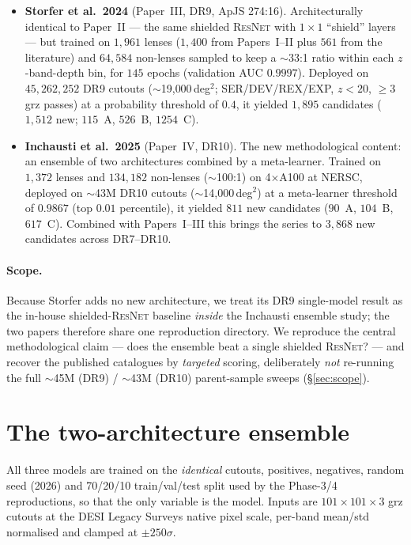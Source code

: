 \documentclass[11pt,letterpaper]{article}
\newcommand{\ResNet}{\textsc{ResNet}}
\begin{document}
\begin{itemize}
  \item \textbf{Storfer et al.\ 2024} \citep{storfer2024dr9} (Paper~III, DR9,
  ApJS 274:16). Architecturally identical to Paper~II --- the same shielded
  \ResNet{} with $1{\times}1$ ``shield'' layers --- but trained on $1{,}961$
  lenses ($1{,}400$ from Papers~I--II plus $561$ from the literature) and
  $64{,}584$ non-lenses sampled to keep a $\sim$33:1 ratio within each
  $z$-band-depth bin, for $145$ epochs (validation AUC $0.9997$). Deployed on
  $45{,}262{,}252$ DR9 cutouts ($\sim$19{,}000\,deg$^2$; SER/DEV/REX/EXP,
  $z<20$, $\ge 3$ grz passes) at a probability threshold of $0.4$, it yielded
  $1{,}895$ candidates ($1{,}512$ new; $115$~A, $526$~B, $1254$~C).
  \item \textbf{Inchausti et al.\ 2025} \citep{inchausti2025dr10} (Paper~IV,
  DR10). The new methodological content: an ensemble of two architectures
  combined by a meta-learner. Trained on $1{,}372$ lenses and $134{,}182$
  non-lenses ($\sim$100:1) on 4$\times$A100 at NERSC, deployed on $\sim$43M DR10
  cutouts ($\sim$14{,}000\,deg$^2$) at a meta-learner threshold of $0.9867$ (top
  $0.01$ percentile), it yielded $811$ new candidates ($90$~A, $104$~B,
  $617$~C). Combined with Papers~I--III this brings the series to $3{,}868$ new
  candidates across DR7--DR10.
\end{itemize}

\paragraph{Scope.} Because Storfer adds no new architecture, we treat its DR9
single-model result as the in-house shielded-\ResNet{} baseline \emph{inside} the
Inchausti ensemble study; the two papers therefore share one reproduction
directory. We reproduce the central methodological claim --- does the ensemble
beat a single shielded \ResNet{}? --- and recover the published catalogues by
\emph{targeted} scoring, deliberately \emph{not} re-running the full $\sim$45M
(DR9) / $\sim$43M (DR10) parent-sample sweeps (\S\ref{sec:scope}).

\section{The two-architecture ensemble}
\label{sec:ensemble}

All three models are trained on the \emph{identical} cutouts, positives,
negatives, random seed (2026) and 70/20/10 train/val/test split used by the
Phase-3/4 reproductions, so that the only variable is the model. Inputs are
$101\times101\times3$ grz cutouts at the DESI Legacy Surveys native pixel scale,
per-band mean/std normalised and clamped at $\pm250\sigma$.
\end{document}
